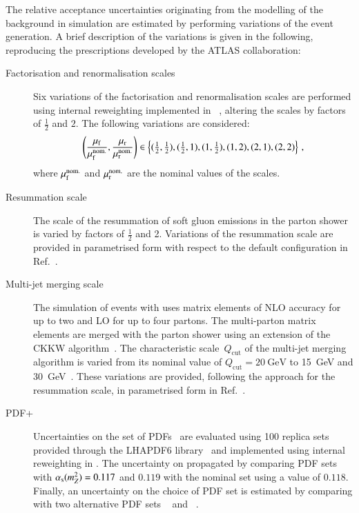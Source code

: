 The relative acceptance uncertainties originating from the modelling
of the \ZHF background in simulation are estimated by performing
variations of the event generation. A brief description of the
variations is given in the following, reproducing the prescriptions
developed by the ATLAS collaboration:
\begin{description}

\item[Factorisation and renormalisation scales] Six variations of the
  factorisation and renormalisation scales are performed using
  internal reweighting implemented in
  \SHERPA[2.2.1]~\cite{Bothmann:2019yzt}, altering the scales by
  factors of $\frac{1}{2}$ and $2$. The following variations are
  considered:
  \begin{align*}
    \left( \frac{\mu_\mathrm{f}}{\mu_\mathrm{f}^{\text{nom.}}}, \frac{\mu_\mathrm{r}}{\mu_\mathrm{r}^{\text{nom.}}} \right) \in
    \left\{ (\tfrac{1}{2}, \tfrac{1}{2}), (\tfrac{1}{2}, 1), (1, \tfrac{1}{2}), (1, 2), (2, 1), (2, 2) \right\} \,\text{,}
  \end{align*}
  where $\mu_\mathrm{f}^{\text{nom.}}$ and $\mu_\mathrm{r}^{\text{nom.}}$ are the nominal
  values of the scales.

\item[Resummation scale] The scale of the resummation of soft gluon
  emissions in the \SHERPA parton shower is varied by factors of
  $\frac{1}{2}$ and 2. Variations of the resummation scale are
  provided in parametrised form with respect to the default \SHERPA
  configuration in Ref.~\cite{anders:2017}.

\item[Multi-jet merging scale] The simulation of \Zjets events with
  \SHERPA[2.2.1] uses matrix elements of NLO accuracy for up to two
  and LO for up to four partons. The multi-parton matrix elements are
  merged with the parton shower using an extension of the CKKW
  algorithm~\cite{Catani:2001cc,Hoeche:2009rj,Hoeche:2012yf}. The
  characteristic scale~$Q_{\text{cut}}$ of the multi-jet merging
  algorithm is varied from its nominal value of
  $Q_{\text{cut}} = \SI{20}{\GeV}$ to \SI{15}{\GeV} and
  \SI{30}{\GeV}~\cite{anders:2017}. These variations are provided,
  following the approach for the resummation scale, in parametrised
  form in Ref.~\cite{anders:2017}.

\item[PDF+\alphas] Uncertainties on the \NNPDF[3.0nnlo] set of
  PDFs~\cite{Ball:2014uwa} are evaluated using 100 replica sets
  provided through the \textsc{LHAPDF6} library~\cite{Buckley:2014ana}
  and implemented using internal reweighting in \SHERPA. The
  uncertainty on \alphas propagated by comparing \NNPDF[3.0nnlo] PDF
  sets with $\alpha_{\text{s}}(m_{Z}^2) = 0.117$ and $0.119$ with the nominal set
  using a value of $0.118$. Finally, an uncertainty on the choice of
  PDF set is estimated by comparing with two alternative PDF sets
  \MMHT[nnlo68cl]~\cite{Harland-Lang:2014zoa} and
  \CT[14nnlo]~\cite{Dulat:2015mca}.


\end{description}
